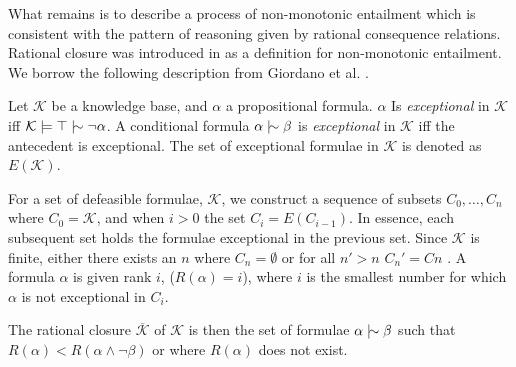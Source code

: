 What remains is to describe a process of non-monotonic entailment which is consistent with the pattern of reasoning given by rational consequence relations. Rational closure was introduced in \cite{lehmann1994what} as a definition for non-monotonic entailment. We borrow the following description from Giordano et al. \cite{giordano2015semantic}.

\begin{definition}
    \label{definition: exceptional}
    Let $\mathcal{K}$ be a knowledge base, and $\alpha$ a propositional formula. $\alpha$ Is \textit{exceptional} in $\mathcal{K}$ iff $\mathcal{K} \models \top \twiddle \neg \alpha$. A conditional formula $\alpha \twiddle \beta$ is \textit{exceptional} in $\mathcal{K}$ iff the antecedent is exceptional. The set of exceptional formulae in $\mathcal{K}$ is denoted as $E(\mathcal{K})$.
\end{definition}

For a set of defeasible formulae, $\mathcal{K}$, we construct a sequence of subsets $C_0,\ldots, C_n$ where $C_0 = \mathcal{K}$, and when $i>0$ the set $C_i = E(C_{i-1})$. In essence, each subsequent set holds the formulae exceptional in the previous set. Since $\mathcal{K}$ is finite, either there exists an $n$ where $C_n = \emptyset$ or for all $n' > n$ $C_n' = Cn$ \cite{giordano2015semantic}. A formula $\alpha$ is given rank $i$, ($R(\alpha)=i$), where $i$ is the smallest number for which $\alpha$ is not exceptional in $C_i$.

The rational closure $\overline{\mathcal{K}}$ of $\mathcal{K}$ is then the set of formulae $\alpha \twiddle \beta$ such that $R(\alpha) < R(\alpha \land \neg \beta)$ or where $R(\alpha)$ does not exist.








